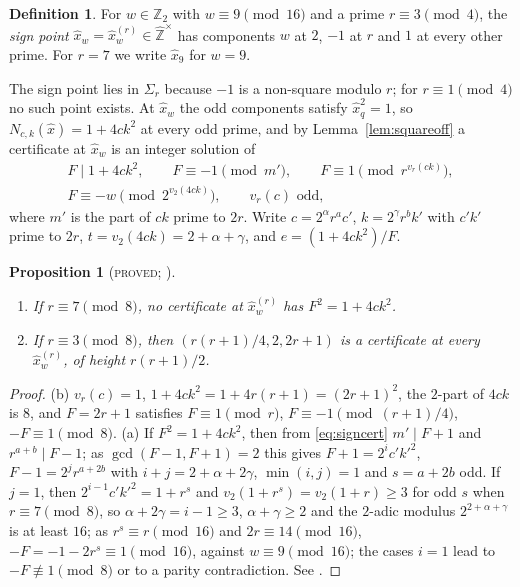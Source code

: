 \documentclass[11pt,reqno]{amsart}
\newtheorem{proposition}[theorem]{Proposition}
\theoremstyle{definition}
\newtheorem{definition}[theorem]{Definition}
\newcommand{\Z}{\mathbb Z}
\newcommand{\Zhu}{\widehat{\Z}^{\times}}
\newcommand{\status}[1]{\textup{\textsc{#1}}}
\begin{document}
\begin{definition}
For $w\in\Z_2$ with $w\equiv9\pmod{16}$ and a prime $r\equiv3\pmod4$, the
\emph{sign point} $\hat x_w=\hat x^{(r)}_w\in\Zhu$ has components
$w$ at $2$, $-1$ at $r$ and $1$ at every other prime.  For $r=7$ we write
$\hat x_9$ for $w=9$.
\end{definition}

The sign point lies in $\Sigma_r$ because $-1$ is a non-square modulo
$r$; for $r\equiv1\pmod4$ no such point exists.  At $\hat x_w$ the odd
components satisfy $\hat x_q^2=1$, so $N_{c,k}(\hat x)=1+4ck^2$ at every
odd prime, and by Lemma~\ref{lem:squareoff} a certificate at $\hat x_w$
is an integer solution of
\begin{equation}\label{eq:signcert}
\begin{gathered}
F\mid1+4ck^2,\qquad F\equiv-1\pmod{m'},\qquad F\equiv1\pmod{r^{v_r(ck)}},\\
F\equiv-w\pmod{2^{v_2(4ck)}},\qquad v_r(c)\text{ odd},
\end{gathered}
\end{equation}
where $m'$ is the part of $ck$ prime to $2r$.  Write $c=2^\alpha r^ac'$,
$k=2^\gamma r^bk'$ with $c'k'$ prime to $2r$, $t=v_2(4ck)=2+\alpha+\gamma$,
and $e=(1+4ck^2)/F$.

\begin{proposition}[\status{proved}; {\cite[Lemma~3.1, Prop.~4.1]{PT2}}]\label{prop:signpoint}
\begin{enumerate}
\item[(a)] If $r\equiv7\pmod 8$, no certificate at $\hat x^{(r)}_w$ has
$F^2=1+4ck^2$.
\item[(b)] If $r\equiv3\pmod8$, then $(r(r+1)/4,2,2r+1)$ is a certificate
at every $\hat x^{(r)}_w$, of height $r(r+1)/2$.
\end{enumerate}
\end{proposition}

\begin{proof}
(b) $v_r(c)=1$, $1+4ck^2=1+4r(r+1)=(2r+1)^2$, the $2$-part of $4ck$ is $8$,
and $F=2r+1$ satisfies $F\equiv1\pmod r$, $F\equiv-1\pmod{(r+1)/4}$,
$-F\equiv1\pmod 8$.  (a) If $F^2=1+4ck^2$, then from \eqref{eq:signcert}
$m'\mid F+1$ and $r^{a+b}\mid F-1$; as $\gcd(F-1,F+1)=2$ this gives
$F+1=2^ic'k'^2$, $F-1=2^jr^{a+2b}$ with $i+j=2+\alpha+2\gamma$,
$\min(i,j)=1$ and $s=a+2b$ odd.  If $j=1$, then $2^{i-1}c'k'^2=1+r^s$ and
$v_2(1+r^{s})=v_2(1+r)\ge3$ for odd $s$ when $r\equiv7\pmod8$, so
$\alpha+2\gamma=i-1\ge3$, $\alpha+\gamma\ge2$ and the $2$-adic modulus
$2^{2+\alpha+\gamma}$ is at least $16$; as $r^s\equiv r\pmod{16}$ and
$2r\equiv14\pmod{16}$, $-F=-1-2r^s\equiv1\pmod{16}$, against
$w\equiv9\pmod{16}$; the cases $i=1$ lead
to $-F\not\equiv1\pmod 8$ or to a parity contradiction.  See
\cite[Lemma~3.1]{PT2}.
\end{proof}
\end{document}
